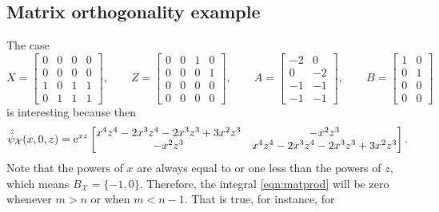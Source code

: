 \documentclass[pdftex]{sigma}
\numberwithin{equation}{section}
\theoremstyle{definition}
\def\X{\mathcal{X}}
\begin{document}
\subsection{Matrix orthogonality example}
The case
\[
X=\left[\begin{matrix}
 0 & 0 & 0 & 0 \\
 0 & 0 & 0 & 0 \\
 1 & 0 & 1 & 1 \\
 0 & 1 & 1 & 1
 \end{matrix}\right],\qquad
Z=\left[\begin{matrix}
 0 & 0 & 1 & 0 \\
 0 & 0 & 0 & 1 \\
 0 & 0 & 0 & 0 \\
 0 & 0 & 0 & 0 \end{matrix}\right],\qquad
A=\left[\begin{matrix}
 -2 & 0 \\
 0 & -2 \\
 -1 & -1 \\
 -1 & -1 \end{matrix}\right],\qquad
B=\left[\begin{matrix}
 1 & 0 \\
 0 & 1 \\
 0 & 0 \\
 0 & 0 \end{matrix}\right]
\]
is interesting because then
\[
\hat{\hat\psi}_{\X}(x,0,z)={\rm e}^{xz}\left[\begin{matrix} x^4 z^4-2 x^3 z^4-2 x^3 z^3+3 x^2 z^3 & -x^2 z^3 \\
 -x^2 z^3 & x^4 z^4-2 x^3 z^4-2 x^3 z^3+3 x^2 z^3\end{matrix}\right].
\]
Note that the powers of $x$ are always equal to or one less than the
powers of $z$, which means $B_{\X}=\{-1,0\}$. Therefore, the
integral \eqref{eqn:matprod} will be zero whenever $m>n$ or when
$m<n-1$. That is true, for instance, for
\end{document}
